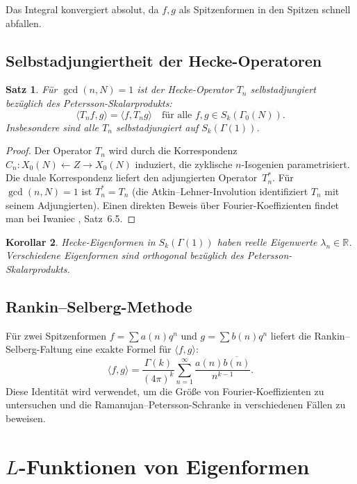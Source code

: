 \documentclass[12pt,a4paper]{amsart}
\newtheorem{theorem}{Satz}[section]
\newtheorem{korollar}[theorem]{Korollar}
\theoremstyle{definition}
\begin{document}
Das Integral konvergiert absolut, da $f, g$ als Spitzenformen in den Spitzen
schnell abfallen.

\subsection{Selbstadjungiertheit der Hecke-Operatoren}

\begin{theorem}\label{thm:selbstadjungiert}
  F\"ur $\gcd(n, N) = 1$ ist der Hecke-Operator $T_n$ selbstadjungiert
  bez\"uglich des Petersson-Skalarprodukts:
  \[
    \langle T_n f, g \rangle = \langle f, T_n g \rangle
    \quad \text{f\"ur alle } f, g \in S_k(\Gamma_0(N)).
  \]
  Insbesondere sind alle $T_n$ selbstadjungiert auf $S_k(\Gamma(1))$.
\end{theorem}

\begin{proof}
  Der Operator $T_n$ wird durch die Korrespondenz
  $C_n \colon X_0(N) \leftarrow Z \to X_0(N)$ induziert, die zyklische
  $n$-Isogenien parametrisiert. Die duale Korrespondenz liefert den adjungierten
  Operator~$T_n^*$. F\"ur $\gcd(n,N)=1$ ist $T_n^* = T_n$ (die Atkin--Lehner-Involution
  identifiziert $T_n$ mit seinem Adjungierten). Einen direkten Beweis \"uber
  Fourier-Koeffizienten findet man bei Iwaniec \cite{Iwaniec}, Satz~6.5.
\end{proof}

\begin{korollar}
  Hecke-Eigenformen in $S_k(\Gamma(1))$ haben reelle Eigenwerte $\lambda_n \in \mathbb{R}$.
  Verschiedene Eigenformen sind orthogonal bez\"uglich des Petersson-Skalarprodukts.
\end{korollar}

\subsection{Rankin--Selberg-Methode}

F\"ur zwei Spitzenformen $f = \sum a(n)q^n$ und $g = \sum b(n)q^n$ liefert
die Rankin--Selberg-Faltung eine exakte Formel f\"ur $\langle f, g \rangle$:
\[
  \langle f, g \rangle = \frac{\Gamma(k)}{(4\pi)^k}
  \sum_{n=1}^{\infty} \frac{a(n)\overline{b(n)}}{n^{k-1}}.
\]
Diese Identit\"at wird verwendet, um die Gr\"o{\ss}e von Fourier-Koeffizienten zu
untersuchen und die Ramanujan--Petersson-Schranke in verschiedenen F\"allen zu
beweisen.

\section{$L$-Funktionen von Eigenformen}
\end{document}
